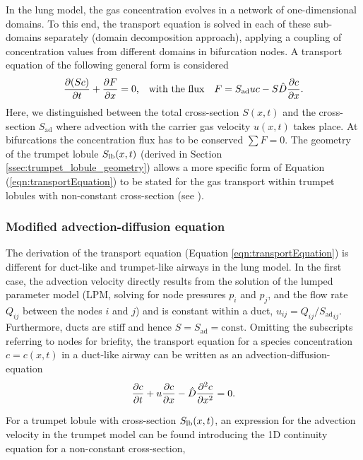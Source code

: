 In the lung model, the gas concentration evolves in a network of one-dimensional domains.
To this end, the transport equation is solved in each of these sub-domains separately (domain decomposition approach), applying a coupling of concentration values from different domains in bifurcation nodes.
A transport equation of the following general form is considered
\begin{equation} \label{eqn:transportEquation}
\frac{\partial (Sc)}{\partial t} + \frac{\partial F}{\partial x} = 0\text{,} \quad\text{with the flux}\quad F = S_\mathrm{ad} u c - S\hat{D}\frac{\partial c}{\partial x} \text{.}
\end{equation}
Here, we distinguished between the total cross-section $S(x,t)$ and the cross-section $S_\mathrm{ad}$ where advection with the carrier gas velocity $u(x,t)$ takes place.
At bifurcations the concentration flux has to be conserved $\sum F = 0$.
The geometry of the trumpet lobule $S_{\mathrm{lb}}(x,t)$ (derived in Section \ref{ssec:trumpet_lobule_geometry}) allows a more specific form of Equation (\ref{eqn:transportEquation}) to be stated for the gas transport within trumpet lobules with non-constant cross-section (see \label{ssec:modified_advection_diffusion_equation}).



\subsubsection{Modified advection-diffusion equation} \label{ssec:modified_advection_diffusion_equation}
The derivation of the transport equation (Equation \ref{eqn:transportEquation}) is different for duct-like and trumpet-like airways in the lung model.
In the first case, the advection velocity directly results from the solution of the lumped parameter model (LPM, solving for node pressures $p_i$ and $p_j$, and the flow rate $Q_{ij}$ between the nodes $i$ and $j$) and is constant within a duct, $u_{ij} = Q_{ij}/{S_\mathrm{ad}}_{ij}$.
Furthermore, ducts are stiff and hence $S = S_\mathrm{ad} = \text{const}$.
Omitting the subscripts referring to nodes for briefity, the transport equation for a species concentration $c = c(x,t)$ in a duct-like airway can be written as an advection-diffusion-equation
\begin{equation} \label{eqn:advectionDiffusionDuct}
\frac{\partial c}{\partial t} + u\frac{\partial c}{\partial x} - \hat{D}\frac{\partial^2 c}{\partial x^2} = 0 \text{.}
\end{equation}


For a trumpet lobule with cross-section $S_{\mathrm{lb}}(x,t)$, an expression for the advection velocity in the trumpet model can be found introducing the 1D continuity equation for a non-constant cross-section,

